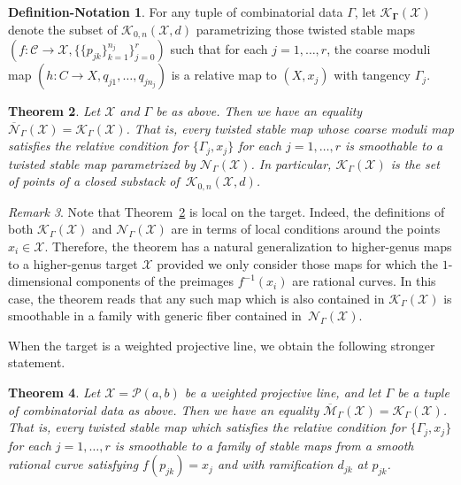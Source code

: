 \documentclass[11pt]{amsart}
\numberwithin{equation}{section}
\newtheorem{theorem}{Theorem}[section]
\theoremstyle{definition}
\newtheorem{defnote}[theorem]{Definition-Notation}
\theoremstyle{remark}
\newtheorem{remark}[theorem]{Remark}
\newcommand{\calK}{\mathcal K}
\newcommand{\calM}{\mathcal M}
\newcommand{\calN}{\mathcal N}
\newcommand{\calX}{\mathcal X}
\newcommand{\calC}{\mathcal C}
\newcommand{\calP}{\mathcal P}
\begin{document}
\begin{defnote}
For any tuple of combinatorial data $\Gamma$, let $\boldsymbol{\calK_\Gamma(\calX)}$ denote the subset of $\calK_{0,n}(\calX, d)$ parametrizing those twisted stable maps $(f \colon \calC \to \calX, \{\{p_{jk}\}_{k = 1}^{n_j}\}_{j = 0}^r)$ such that for each $j = 1, \ldots, r$, the coarse moduli map $(h \colon C \to X, q_{j1}, \ldots, q_{jn_j})$ is a relative map to $(X, x_j)$ with tangency $\Gamma_j$. 
\end{defnote} 

\begin{theorem}\label{mainthm} Let $\calX$ and $\Gamma$ be as above. Then we have an equality $\overline{\calN}_\Gamma(\calX) = \calK_{\Gamma}(\calX)$. That is, every twisted stable map whose coarse moduli map satisfies the relative condition for $\{\Gamma_j, x_j\}$ for each $j = 1, \dots, r$ is smoothable to a twisted stable map parametrized by $\calN_\Gamma(\calX)$. In particular, $\calK_{\Gamma}(\calX)$ is the set of points of a closed substack of~$\calK_{0,n}(\calX, d)$. 
\end{theorem}

\begin{remark} Note that Theorem~\ref{mainthm} is local on the target. Indeed,  the definitions of both $\calK_{\Gamma}(\calX)$ and $\calN_\Gamma(\calX)$ are in terms of local conditions around the points $x_i \in \calX$. Therefore, the theorem has a natural generalization to higher-genus maps to a higher-genus target $\calX$ provided we only consider those maps for which the $1$-dimensional components of the preimages $f^{-1}(x_i)$ are rational curves. In this case, the theorem reads that any such map which is also contained in $\calK_\Gamma(\calX)$ is smoothable in a family with generic fiber contained in~$\calN_\Gamma(\calX)$. 
\end{remark} 

When the target is a weighted projective line, we obtain the following stronger statement. 

\begin{theorem}\label{mainthm2} Let $\calX = \calP(a,b)$ be a weighted projective line, and let $\Gamma$ be a tuple of combinatorial data as above. Then we have an equality $\overline{\calM}_\Gamma(\calX) = \calK_\Gamma(\calX)$. That is, every twisted stable map which satisfies the relative condition for $\{\Gamma_j, x_j\}$ for each $j = 1, \ldots, r$ is smoothable to a family of stable maps from a smooth rational curve satisfying $f(p_{jk}) = x_j$ and with ramification $d_{jk}$ at $p_{jk}$. 
\end{theorem}
\end{document}
